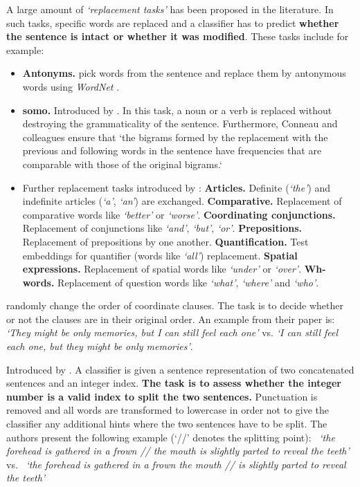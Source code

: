   A large amount of \textit{`replacement tasks'} has been proposed in the literature. In such tasks, specific words are replaced and a classifier has to predict \textbf{whether the sentence is intact or whether it was modified}. These tasks include for example:

\begin{itemize}
	\item \textbf{Antonyms.} \citep{Naik.2018} pick words from the sentence and replace them by antonymous words using \textit{WordNet} \citep{Miller.1995}. 
	\item \textbf{\gls{somo}.} Introduced by \citep{Conneau.2018a}. In this task, a noun or a verb is replaced without destroying the grammaticality of the sentence. Furthermore, Conneau and colleagues ensure that `the bigrams formed by the replacement with the previous and following words in the sentence have frequencies that are comparable with those of the original bigrams.`
	\item Further replacement tasks introduced by \citep{Kim.2019}: \textbf{Articles.} Definite (\textit{`the'}) and indefinite articles (\textit{`a'}, \textit{`an'}) are exchanged. \textbf{Comparative.} Replacement of comparative words like \textit{`better'} or \textit{`worse'}. \textbf{Coordinating conjunctions.} Replacement of conjunctions like \textit{`and'}, \textit{`but'}, \textit{`or'}. \textbf{Prepositions.} Replacement of prepositions by one another. \textbf{Quantification.} Test embeddings for quantifier (words like \textit{`all'}) replacement. \textbf{Spatial expressions.} Replacement of spatial words like \textit{`under'} or \textit{`over'}. \textbf{Wh-words.} Replacement of question words like \textit{`what'}, \textit{`where'} and \textit{`who'}.
\end{itemize}

  \citep{Conneau.2018a} randomly change the order of coordinate clauses. The task is to decide whether or not the clauses are in their original order. An example from their paper is: \textit{`They might be only memories, but I can still feel each one'} vs. \textit{`I can still feel each one, but they might be only memories'}.

  Introduced by \citep{Kim.2019}. A classifier is given a sentence representation of two concatenated sentences and an integer index. \textbf{The task is to assess whether the integer number is a valid index to split the two sentences.} Punctuation is removed and all words are transformed to lowercase in order not to give the classifier any additional hints where the two sentences have to be split. The authors present the following example (`//' denotes the splitting point): \cmarkgr\ \textit{`the forehead is gathered in a frown // the mouth is slightly parted to reveal the teeth'} vs. \xmark\ \textit{`the forehead is gathered in a frown the mouth // is slightly parted to reveal the teeth'}

